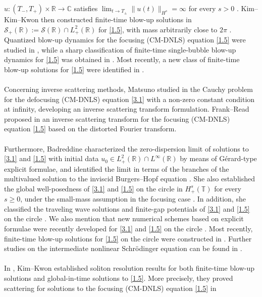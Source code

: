 \documentclass[10pt]{article}
\numberwithin{equation}{section}
\numberwithin{theorem}{section}
\begin{document}
$u:(T_-,T_+)\times\mathbb{R}\to\mathbb{C}$
satisfies
$\lim_{t\to T_\pm}\|u(t)\|_{H^s}=\infty$
for every $s>0$ \cite{9}. Kim--Kim--Kwon then constructed finite-time blow-up solutions in $\mathcal{S}_{+}(\mathbb{R}):=\mathcal{S}(\mathbb{R})\cap L_{+}^2(\mathbb{R})$ for \eqref{1.5}, with mass arbitrarily close to $2\pi$ \cite{10}. Quantized blow-up dynamics for the focusing (CM-DNLS) equation \eqref{1.5} were studied in \cite{56}, while a sharp classification of finite-time single-bubble blow-up dynamics for \eqref{1.5} was obtained in \cite{59}. Most recently, a new class of finite-time blow-up solutions for \eqref{1.5} were identified in \cite{67}.\\\\
Concerning inverse scattering methods, Matsuno studied in \cite{54} the Cauchy problem for the defocusing (CM-DNLS) equation \eqref{3.1} with a non-zero constant condition at infinity, developing an inverse scattering transform formulation. Frank--Read proposed in \cite{78} an inverse scattering transform for the focusing (CM-DNLS) equation \eqref{1.5} based on the distorted Fourier transform.\\\\
Furthermore, Badreddine characterized the zero-dispersion limit of solutions to \eqref{3.1} and \eqref{1.5} with initial data
$u_0\in L_{+}^2(\mathbb{R})\cap L^\infty(\mathbb{R})$
by means of G\'erard-type explicit formulae, and identified the limit in terms of the branches of the multivalued solution to the inviscid Burgers--Hopf equation \cite{13}. She also established the global well-posedness of \eqref{3.1} and \eqref{1.5} on the circle in $H_{+}^s(\mathbb{T})$ for every $s\geq 0$, under the small-mass assumption in the focusing case \cite{11}. In addition, she classified the traveling wave solutions and finite-gap potentials of \eqref{3.1} and \eqref{1.5} on the circle \cite{12}. We also mention that new numerical schemes based on explicit formulae were recently developed for \eqref{3.1} and \eqref{1.5} on the circle \cite{90,89}. Most recently, finite-time blow-up solutions for \eqref{1.5} on the circle were constructed in \cite{66}. Further studies on the intermediate nonlinear Schr\"odinger equation can be found in \cite{52,60,53,55,42,57}.\\\\
In \cite{23}, Kim--Kwon established soliton resolution results for both finite-time blow-up solutions and global-in-time solutions to \eqref{1.5}. More precisely, they proved scattering for solutions to the focusing (CM-DNLS) equation \eqref{1.5} in
\end{document}
